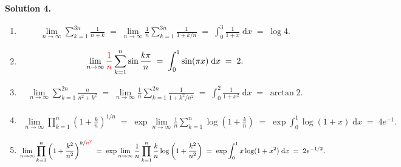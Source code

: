 \documentclass[10pt]{article}
\begin{document}
        \textbf{Solution 4.}
        \begin{enumerate}
                \item
                        \begin{align*}
                                \lim_{n \to \infty} \sum_{k = 1}^{3n} \frac{1}{n + k}
                                \;=\; \lim_{n \to \infty} \frac{1}{n}\sum_{k = 1}^{3n} \frac{1}{1 + k /n}
                                \;=\; \int_0^3 \frac{1}{1 + x} \;\mathrm{d}{x}
                                \;=\; \log{4}.
                        \end{align*}
                \item 
                        \begin{align*}
                                \lim_{n \to \infty} \textcolor{red}{\frac{1}{n}}\sum_{k = 1}^{n} \sin{\frac{k\pi}{n}}
                                \;=\; \int_0^1 \sin(\pi x) \;\mathrm{d}{x}
                                \;=\; 2.
                        \end{align*}
                \item 
                        \begin{align*}
                                \lim_{n \to \infty} \sum_{k = 1}^{2n} \frac{n}{n^2 + k^2}
                                \;=\; \lim_{n \to \infty} \frac{1}{n}\sum_{k = 1}^{2n} \frac{1}{1 + k^2 /n^2}
                                \;=\; \int_0^2 \frac{1}{1 + x^2} \;\mathrm{d}{x}
                                \;=\; \arctan{2}.
                        \end{align*}
                \item 
                        \begin{align*}
                                \lim_{n \to \infty} \prod_{k = 1}^{n} \left(1 + \frac{k}{n}\right)^{1 /n}
                                \;=\; \exp \lim_{n \to \infty} \frac{1}{n}\sum_{k = 1}^{n} \log\left(1 + \frac{k}{n} \right)
                                \;=\; \exp \int_0^1 \log(1 + x) \;\mathrm{d}{x}
                                \;=\; 4 e^{-1}.
                        \end{align*}
                \item 
                        \begin{align*}
                                \lim_{n \to \infty} \prod_{k = 1}^n \left(1 + \frac{k^2}{n^2}\right)^{k /\color{red}{n^2}}
                                \;=\; \exp \lim_{n \to \infty} \frac{1}{n} \prod_{k = 1}^n \frac{k}{n} \log\left(1 + \frac{k^2}{n^2}\right)
                                \;=\; \exp \int_0^1 x \log(1 + x^2) \;\mathrm{d}x
                                \;=\; 2e^{-1 /2}.
                        \end{align*}
        \end{enumerate}
        
\end{document}
